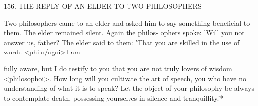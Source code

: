 156. THE REPLY OF AN ELDER
TO TWO PHILOSOPHERS

Two philosophers came to an elder and asked him to say something
beneficial to them. The elder remained silent. Again the philos-
ophers spoke: 'Will you not answer us, father? The elder said to
them: 'That you are skilled in the use of words <philo/ogoi>I am

fully aware, but I do testify to you that you are not truly lovers of
wisdom <philosophoi>. How long will you cultivate the art of
speech, you who have no understanding of what it is to speak? Let
the object of your philosophy be always to contemplate death,
possessing yourselves in silence and tranquillity.'*

